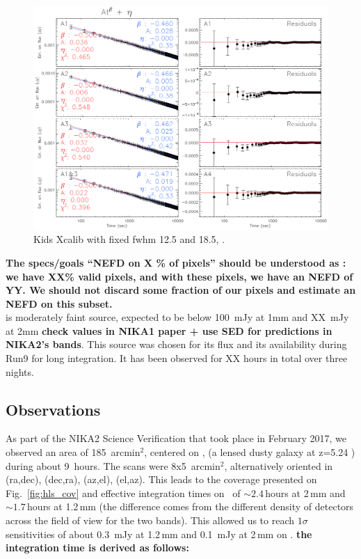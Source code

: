 
\begin{figure}
\begin{center}
\includegraphics[clip, angle=0, scale = 0.5]{Figures/nefd_mpfit_HLS091828.eps}
\caption{Kids Xcalib with fixed fwhm 12.5 and 18.5, \hls.}
\label{fig:nefd_vs_t}
\end{center}
\end{figure}

{\bf The specs/goals ``NEFD on X \% of pixels'' should be understood as : we have
XX\% valid pixels, and with these pixels, we have an NEFD of YY. We should not
discard some fraction of our pixels and estimate an NEFD on this subset.}\\

\hls is moderately faint source, expected to be below 100~mJy at 1mm and
XX~mJy at 2mm {\bf check values in NIKA1 paper + use SED for predictions in
  NIKA2's bands}. This source was chosen for its flux and its availability during
Run9 for long integration. It has been observed for XX hours in total over three
nights.


\subsection{Observations}

As part of the NIKA2 Science Verification that took place in February 2017, we
observed an area of 185~arcmin$^2$, centered on \hls, (a lensed dusty galaxy at
z=5.24 \cite{combes2012}) during about 9~hours. The scans were 8x5~arcmin$^2$,
alternatively oriented in (ra,dec), (dec,ra), (az,el), (el,az). This leads to
the coverage presented on Fig.~\ref{fig:hls_cov} and effective integration times
on \hls\ of $\sim 2.4$\,hours at 2\,mm and $\sim 1.7$\,hours at 1.2\,mm (the difference comes from
the different density of detectors across the field of view for the two
bands). This allowed us to reach $1\sigma$ sensitivities of about 0.3~mJy at
1.2\,mm and 0.1~mJy at 2\,mm on \hls. {\bf the integration time is derived as follows:}

